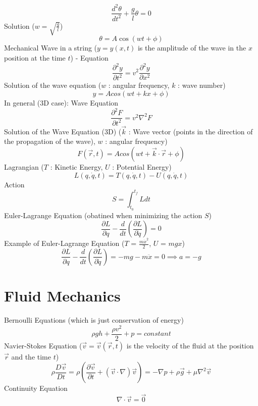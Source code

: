 \documentclass{article}
\begin{document}
\begin{equation}
  \frac{d^2\theta}{dt^2} + \frac{g}{l}\theta = 0
\end{equation}
Solution ($w=\sqrt{\frac{g}{l}}$)
\begin{equation}
  \theta = A\cos(wt + \phi)
\end{equation}
Mechanical Wave in a string ($y = y(x,t)$ is the amplitude of the wave in the $x$ position at the time $t$) - Equation
\begin{equation}
  \frac{\partial^2y}{\partial t^2} = v^2\frac{\partial^2y}{\partial x^2}
\end{equation}
Solution of the wave equation ($w$ : angular frequency, $k$ : wave number)
\begin{equation}
  y = Acos(wt + kx + \phi)
\end{equation}
In general (3D case): Wave Equation
\begin{equation}
  \frac{\partial^2 F}{\partial t^2} = v^2\nabla^2 F
\end{equation}
Solution of the Wave Equation (3D) ($\vec{k}$ : Wave vector (points in the direction of the propagation of the wave), $w$ : angular frequency)
\begin{equation}
  F(\vec{r},t) = Acos(wt + \vec{k}\cdot\vec{r} + \phi )
\end{equation}
Lagrangian ($T$ : Kinetic Energy, $U$ : Potential Energy)
\begin{equation}
  L(q,\dot{q},t) = T(q,\dot{q},t) - U(q,\dot{q},t)
\end{equation}
Action
\begin{equation}
  S = \int_{t_0}^{t_f}Ldt
\end{equation}
Euler-Lagrange Equation (obatined when minimizing the action $S$)
\begin{equation}
  \frac{\partial L}{\partial q} - \frac{d}{dt}(\frac{\partial L}{\partial \dot{q}}) = 0
\end{equation}
Example of Euler-Lagrange Equation ($T$ = $\frac{m\dot{x}^2}{2}$, $U$ = $mgx$)
\begin{equation}
  \frac{\partial L}{\partial q} - \frac{d}{dt}(\frac{\partial L}{\partial \dot{q}}) = -mg -m\ddot x=0 \implies a = -g
\end{equation}

\section{Fluid Mechanics}
Bernoulli Equations (which is just conservation of energy)
\begin{equation}
  \rho gh + \frac{\rho v^2}{2} + p = constant
\end{equation}
Navier-Stokes Equation ($\vec{v} = \vec{v}(\vec{r},t)$ is the velocity of the fluid at the position $\vec{r}$ and the time $t$)
\begin{equation}
  \rho \frac{D \vec{v}}{Dt} = \rho (\frac{\partial \vec{v}}{\partial t} + (\vec{v}\cdot \nabla)\vec{v}) = -\nabla p+\rho \vec{g} + \mu \nabla^2 \vec{v}
\end{equation}
Continuity Equation
\begin{equation}
  \nabla \cdot \vec{v} = \vec{0}
\end{equation}
\end{document}
